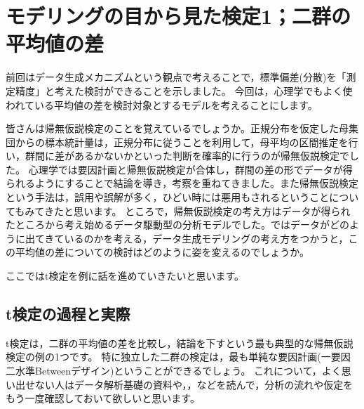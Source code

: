 \documentclass{ltjsbook}
\begin{document}
 
\chapter{モデリングの目から見た検定1；二群の平均値の差}
\label{chapter19} 
前回はデータ生成メカニズムという観点で考えることで，標準偏差(分散)を「測定精度」と考えた検討ができることを示しました。
今回は，心理学でもよく使われている平均値の差を検討対象とするモデルを考えることにします。

皆さんは帰無仮説検定のことを覚えているでしょうか。正規分布を仮定した母集団からの標本統計量は，正規分布に従うことを利用して，母平均の区間推定を行い，群間に差があるかないかといった判断を確率的に行うのが帰無仮説検定でした。
心理学では要因計画と帰無仮説検定が合体し，群間の差の形でデータが得られるようにすることで結論を導き，考察を重ねてきました。また帰無仮説検定という手法は，誤用や誤解が多く，ひどい時には悪用もされるということについてもみてきたと思います。
ところで，帰無仮説検定の考え方はデータが得られたところから考え始めるデータ駆動型の分析モデルでした。ではデータがどのように出てきているのかを考える，データ生成モデリングの考え方をつかうと，この平均値の差についての検討はどのように姿を変えるのでしょうか。

ここではt検定を例に話を進めていきたいと思います。
\section{t検定の過程と実際}
t検定は，二群の平均値の差を比較し，結論を下すという最も典型的な帰無仮説検定の例の1つです。
特に独立した二群の検定は，最も単純な要因計画(一要因二水準Betweenデザイン)ということができるでしょう。
これについて，よく思い出せない人はデータ解析基礎の資料や，\citet{Yamada2004}，\citet{清水2021}などを読んで，分析の流れや仮定をもう一度確認しておいて欲しいと思います。
\end{document}

